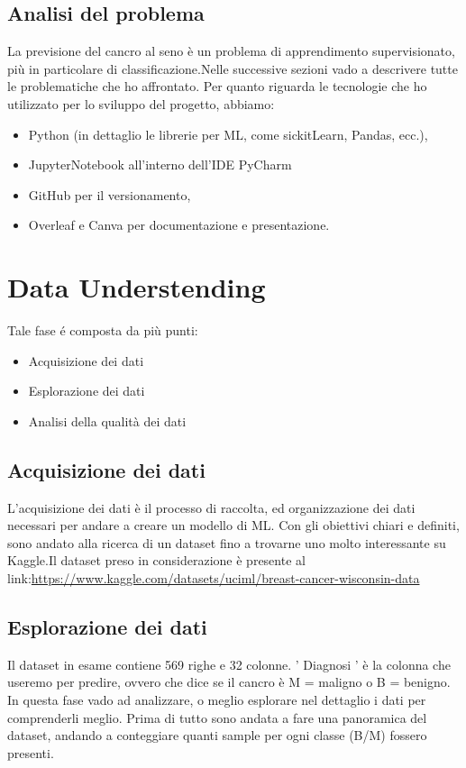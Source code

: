\documentclass{article}
\begin{document}
\subsection{Analisi del problema}
La previsione del cancro al seno è un problema di apprendimento supervisionato, più in particolare di classificazione.Nelle successive sezioni vado a descrivere tutte le problematiche che ho affrontato.
Per quanto riguarda le tecnologie che ho utilizzato per lo sviluppo del progetto, abbiamo:
\begin{itemize}
    \item Python (in dettaglio le librerie per ML, come sickitLearn, Pandas, ecc.),
    \item JupyterNotebook all’interno dell’IDE PyCharm
    \item GitHub per il versionamento,
    \item Overleaf e Canva per documentazione e presentazione.
\end{itemize}

\newpage
\section{Data Understending}
Tale fase é composta da più punti:
\begin{itemize}
    \item Acquisizione dei dati
    \item Esplorazione dei dati
    \item Analisi della qualità dei dati
\end{itemize}

\subsection{Acquisizione dei dati}
L’acquisizione dei dati è il processo di raccolta, ed organizzazione dei dati necessari per andare a creare un modello di ML. Con gli obiettivi chiari e definiti, sono andato alla ricerca di un dataset fino a trovarne uno molto interessante su Kaggle.Il dataset preso in considerazione è presente al link:\url{https://www.kaggle.com/datasets/uciml/breast-cancer-wisconsin-data}


\subsection{Esplorazione dei dati}
Il dataset in esame contiene 569 righe e 32 colonne. ' Diagnosi ' è la colonna che useremo per predire, ovvero che dice se il cancro è M = maligno o B = benigno.  In questa fase vado ad analizzare, o meglio esplorare nel dettaglio i dati per comprenderli meglio.
Prima di tutto sono andata a fare una panoramica del dataset, andando a conteggiare quanti sample per ogni classe (B/M) fossero presenti.
\end{document}
